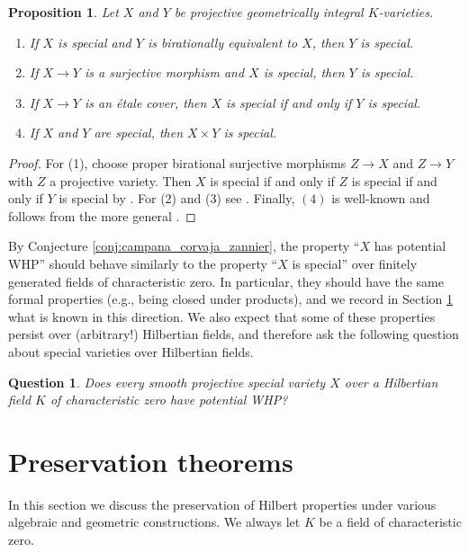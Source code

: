 \documentclass[10pt,a4paper]{amsart}
\theoremstyle{plain}
\newtheorem{proposition}[theorem]{Proposition}
\newtheorem{question}[theorem]{Question}
\theoremstyle{remark}
\numberwithin{theorem}{section}
\begin{document}
\begin{proposition}\label{thm:special} 
    Let $X$ and $Y$ be projective geometrically integral $K$-varieties.
    \begin{enumerate}
        \item If $X$ is special and $Y$ is birationally equivalent to $X$, then $Y$ is special.
        \item  If $X\to Y$ is a surjective morphism and $X$ is special, then $Y$ is special.
        \item   If $X\to Y$ is an \'etale cover, then $X$ is special if and only if $Y$ is special.
        \item If $X$ and $Y$ are special, then $X\times Y$ is special.
    \end{enumerate}
\end{proposition}
\begin{proof} 
For (1), choose  proper birational surjective morphisms $Z\to X$ and $Z\to Y$ with $Z$ a projective variety. Then $X$ is special if and only if $Z$ is special if and only if $Y$ is special by \cite[Lemma~2.8(2)]{BJL}. For (2) and (3) see \cite[Lemma~2.8(1,3)]{BJL}.  Finally, $(4)$ is well-known and follows from the more general \cite[Lemma~2.10]{Bartsch}. 
\end{proof}

By Conjecture \ref{conj:campana_corvaja_zannier}, the property ``$X$ has potential WHP'' should  behave similarly to the property    ``$X$ is special'' over finitely generated fields of characteristic zero. In particular, they should have the same formal properties (e.g., being closed under products),
and we record in Section \ref{sec:preservation} what is known in this direction. 
We also expect that some of these properties persist over (arbitrary!) Hilbertian fields, and therefore ask the following question about special varieties over Hilbertian fields.

\begin{question}\label{q:special_Hilbertian}
Does every smooth projective special variety $X$ over a Hilbertian field $K$ of characteristic zero
have potential WHP?
\end{question}


\section{Preservation theorems}
\label{sec:preservation}

\noindent
In this section we discuss the preservation of Hilbert properties
under various algebraic and geometric constructions.
We always let $K$ be a field of characteristic zero.
\end{document}
